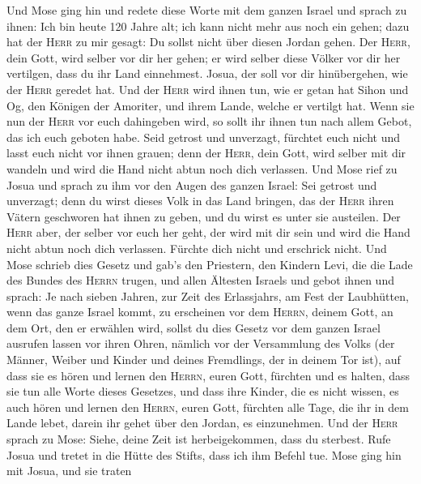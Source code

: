  Und Mose ging hin und redete diese Worte mit dem ganzen
Israel  und sprach zu ihnen: Ich bin heute 120 Jahre alt;
ich kann nicht mehr aus noch ein gehen; dazu hat der \textsc{Herr} zu
mir gesagt: Du sollst nicht über diesen Jordan gehen.  Der
\textsc{Herr}, dein Gott, wird selber vor dir her gehen; er wird selber
diese Völker vor dir her vertilgen, dass du ihr Land einnehmest. Josua,
der soll vor dir hinübergehen, wie der \textsc{Herr} geredet hat.
 Und der \textsc{Herr} wird ihnen tun, wie er getan hat
Sihon und Og, den Königen der Amoriter, und ihrem Lande, welche er
vertilgt hat.  Wenn sie nun der \textsc{Herr} vor euch
dahingeben wird, so sollt ihr ihnen tun nach allem Gebot, das ich euch
geboten habe.  Seid getrost und unverzagt, fürchtet euch
nicht und lasst euch nicht vor ihnen grauen; denn der \textsc{Herr},
dein Gott, wird selber mit dir wandeln und wird die Hand nicht abtun
noch dich verlassen.  Und Mose rief zu Josua und sprach zu
ihm vor den Augen des ganzen Israel: Sei getrost und unverzagt; denn du
wirst dieses Volk in das Land bringen, das der \textsc{Herr} ihren
Vätern geschworen hat ihnen zu geben, und du wirst es unter sie
austeilen.  Der \textsc{Herr} aber, der selber vor euch
her geht, der wird mit dir sein und wird die Hand nicht abtun noch dich
verlassen. Fürchte dich nicht und erschrick nicht.  Und
Mose schrieb dies Gesetz und gab's den Priestern, den Kindern Levi, die
die Lade des Bundes des \textsc{Herrn} trugen, und allen Ältesten
Israels  und gebot ihnen und sprach: Je nach sieben
Jahren, zur Zeit des Erlassjahrs, am Fest der Laubhütten,
 wenn das ganze Israel kommt, zu erscheinen vor dem
\textsc{Herrn}, deinem Gott, an dem Ort, den er erwählen wird, sollst du
dies Gesetz vor dem ganzen Israel ausrufen lassen vor ihren Ohren,
 nämlich vor der Versammlung des Volks (der Männer,
Weiber und Kinder und deines Fremdlings, der in deinem Tor ist), auf
dass sie es hören und lernen den \textsc{Herrn}, euren Gott, fürchten
und es halten, dass sie tun alle Worte dieses Gesetzes, 
und dass ihre Kinder, die es nicht wissen, es auch hören und lernen den
\textsc{Herrn}, euren Gott, fürchten alle Tage, die ihr in dem Lande
lebet, darein ihr gehet über den Jordan, es einzunehmen. 
Und der \textsc{Herr} sprach zu Mose: Siehe, deine Zeit ist
herbeigekommen, dass du sterbest. Rufe Josua und tretet in die Hütte des
Stifts, dass ich ihm Befehl tue. Mose ging hin mit Josua, und sie traten
